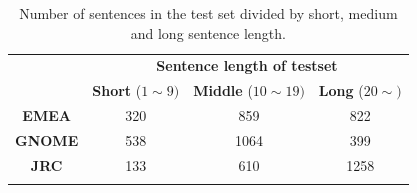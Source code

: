 \begin{table}[h!]
\centering
\begin{tabular}{cclclcl}
\Xhline{3\arrayrulewidth}
\multirow{2}{*}{} & \multicolumn{6}{c}{\textbf{Sentence length of testset}}                                                                 \\ \cline{2-7} 
                  & \multicolumn{2}{c}{\textbf{Short} ($1\sim9)$} & \multicolumn{2}{c}{\textbf{Middle} ($10\sim19)$} & \multicolumn{2}{c}{\textbf{Long} ($20\sim)$} \\ \hline
\textbf{EMEA}     & \multicolumn{2}{c}{320}            & \multicolumn{2}{c}{859}             & \multicolumn{2}{c}{822}           \\ \hline
\textbf{GNOME}    & \multicolumn{2}{c}{538}            & \multicolumn{2}{c}{1064}            & \multicolumn{2}{c}{399}           \\ \hline
\textbf{JRC}      & \multicolumn{2}{c}{133}            & \multicolumn{2}{c}{610}             & \multicolumn{2}{c}{1258}          \\ \Xhline{3\arrayrulewidth}
\end{tabular}
\caption{Number of sentences in the test set divided by short, medium and long sentence length.}
\label{tab:lenght_of_sentences}
\end{table}

